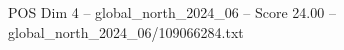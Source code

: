 \begin{textsample}{POS Dim 4 – global\_north\_2024\_06 – Score 24.00 – global\_north\_2024\_06/109066284.txt}
\end{textsample}

